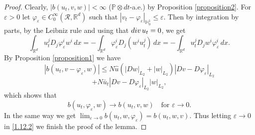 \documentclass[10pt,a4paper]{amsart}
\newcommand\bH{\mathbb{H}}
\newcommand\bR{\mathbb{R}}
\newcommand\cR{\mathcal{R}}
\renewcommand{\P}{\mathbb{P}}
\begin{document}
\begin{proof}
Clearly, $|b(u_t,v,w)|<\infty$ \rm{($\P\otimes dt$-a.e.)} 
by Proposition \ref{proposition2}. 
For $\varepsilon>0$ let 
$\varphi_{\varepsilon}\in C_0^{\infty}(\cR,\bR^d)$ such that 
$|v_t-\varphi_{\varepsilon}|_{\bH^1_0}\leq\varepsilon$. Then 
by integration by parts, by the Leibniz rule 
and using that ${\rm div}\, u_t=0$,  we get 
\begin{equation}
                                                                 \label{1.12.2}
\int_{\bR^d}u^j_tD_j\varphi^i_{\varepsilon}w^i\,dx
=-\int_{\bR^d}\varphi_{\varepsilon}^iD_j(w^iu_t^j)\,dx 
=-\int_{\bR^d}u^j_tD_jw^i\varphi_{\varepsilon}^i\,dx. 
\end{equation}
By Proposition \ref{proposition1} we have 
$$
|b(u_t,v-\varphi_{\varepsilon},w)|\leq N\hat u(|Dw|_{L_2}
+|w|_{L_2})|Dv-D\varphi_{\varepsilon}|_{L_2}
$$
$$ 
+N\bar u_t|Dv-D\varphi_{\varepsilon}|_{L_2}|w|_{L_2},  
$$
which shows that 
$$
b(u_t,\varphi_{\varepsilon},w)\to b(u_t,v,w)
\quad \text{for $\varepsilon\to0$}.
$$
In the same way we get 
$\lim_{\varepsilon\to0} b(u_t,w, \varphi_{\varepsilon})= b(u_t,w, v)$. 
Thus letting $\varepsilon\to0$ in \eqref{1.12.2} we finish the proof 
of the lemma. 
\end{proof}
\end{document}

